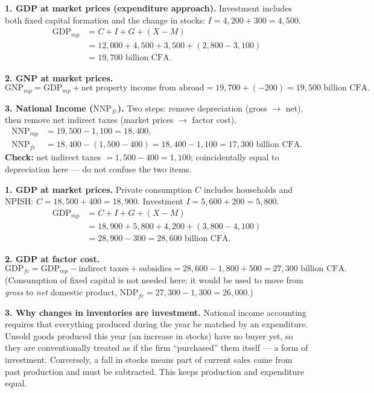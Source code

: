 \documentclass[11pt]{article}
\newcommand{\cle}[1]{{\popxbold\color{popdark}#1}}
\newcounter{popsec}
\newcounter{popsub}
\newcommand{\courssub}[1]{%
  \stepcounter{popsub}%
  \par\vspace{9pt}\noindent{\popxbold\fontsize{11.5}{13}\selectfont\color{popink}{\color{poporange}\thepopsec.\thepopsub}\hspace{6pt}#1}\par\nopagebreak\vspace{4pt}
}
\begin{document}
\begin{corrige}
\textbf{1. GDP at market prices (expenditure approach).} Investment includes both fixed capital formation and the change in stocks: $I = 4{,}200 + 300 = 4{,}500$.
\begin{align*}
\mathrm{GDP}_{mp} &= C + I + G + (X - M)\\
&= 12{,}000 + 4{,}500 + 3{,}500 + (2{,}800 - 3{,}100)\\
&= \boxed{19{,}700 \text{ billion CFA}}.
\end{align*}

\textbf{2. GNP at market prices.}
\[
\mathrm{GNP}_{mp} = \mathrm{GDP}_{mp} + \text{net property income from abroad} = 19{,}700 + (-200) = \boxed{19{,}500 \text{ billion CFA}}.
\]

\textbf{3. National Income ($\mathrm{NNP}_{fc}$).} Two steps: remove depreciation (gross $\to$ net), then remove net indirect taxes (market prices $\to$ factor cost).
\begin{align*}
\mathrm{NNP}_{mp} &= 19{,}500 - 1{,}100 = 18{,}400,\\
\mathrm{NNP}_{fc} &= 18{,}400 - (1{,}500 - 400) = 18{,}400 - 1{,}100 = \boxed{17{,}300 \text{ billion CFA}}.
\end{align*}
\textbf{Check:} net indirect taxes $= 1{,}500 - 400 = 1{,}100$; coincidentally equal to depreciation here — do not confuse the two items.
\end{corrige}

\courssub{Solutions — I practise}

\begin{corrige}
\textbf{1. GDP at market prices.} Private consumption $C$ includes households and NPISH: $C = 18{,}500 + 400 = 18{,}900$. Investment $I = 5{,}600 + 200 = 5{,}800$.
\begin{align*}
\mathrm{GDP}_{mp} &= C + I + G + (X - M)\\
&= 18{,}900 + 5{,}800 + 4{,}200 + (3{,}800 - 4{,}100)\\
&= 28{,}900 - 300 = \boxed{28{,}600 \text{ billion CFA}}.
\end{align*}

\textbf{2. GDP at factor cost.}
\[
\mathrm{GDP}_{fc} = \mathrm{GDP}_{mp} - \text{indirect taxes} + \text{subsidies} = 28{,}600 - 1{,}800 + 500 = \boxed{27{,}300 \text{ billion CFA}}.
\]
(Consumption of fixed capital is not needed here: it would be used to move from \emph{gross} to \emph{net} domestic product, $\mathrm{NDP}_{fc} = 27{,}300 - 1{,}300 = 26{,}000$.)

\textbf{3. Why changes in inventories are investment.} National income accounting requires that everything produced during the year be matched by an expenditure. Unsold goods produced this year (an increase in stocks) have no buyer yet, so they are conventionally treated as if the firm ``purchased'' them itself — a form of \cle{investment}. Conversely, a fall in stocks means part of current sales came from past production and must be subtracted. This keeps production and expenditure equal.
\end{corrige}
\end{document}
